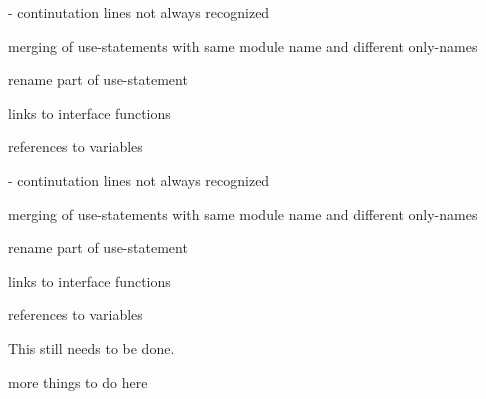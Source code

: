 
\begin{DoxyRefList}
\item[Member \mbox{\hyperlink{build_2generated__src_2fortrancode_8cpp_a234e2efe67eececd88b140b46ea37463}{D\+B\+G\+\_\+\+C\+TX}} (x)]\label{todo__todo000001}%
%
-\/ continutation lines not always recognized
\begin{DoxyItemize}
\item merging of use-\/statements with same module name and different only-\/names
\item rename part of use-\/statement
\item links to interface functions
\item references to variables 
\end{DoxyItemize}

\label{todo__todo000003}%
%
-\/ continutation lines not always recognized
\begin{DoxyItemize}
\item merging of use-\/statements with same module name and different only-\/names
\item rename part of use-\/statement
\item links to interface functions
\item references to variables  
\end{DoxyItemize}
\item[Class \mbox{\hyperlink{class_todo}{Todo}} ]\label{todo__todo000005}%
%
This still needs to be done.  
\item[Member \mbox{\hyperlink{class_todo_a9e70ec9176ac4c1b20e011b4daddc9d8}{Todo::todo}} ()]\label{todo__todo000006}%
%
more things to do here 
\end{DoxyRefList}